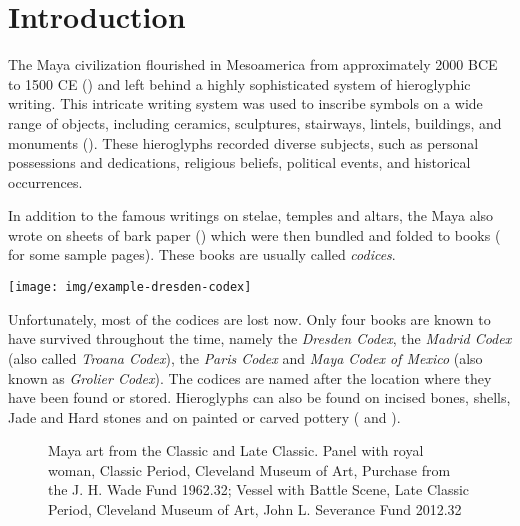 \documentclass[../main.tex]{subfiles}
\begin{document}
\chapter{Introduction}
The Maya civilization flourished in Mesoamerica from approximately 2000 BCE to 1500 CE 
(\cite[3]{estrada-belli2011}) and left behind a highly sophisticated system of hieroglyphic writing. 
This intricate writing system was used to inscribe symbols on a wide range of 
objects, including ceramics, sculptures, stairways, lintels, buildings, 
and monuments (\cite[\ppno~17--27]{thompson1962}). 
These hieroglyphs recorded diverse subjects, such as personal possessions and dedications, 
religious beliefs, political events, and historical occurrences.

In addition to the famous writings on stelae, temples and altars, the Maya also wrote on sheets of 
bark paper (\cite[34\psq]{vonhagen1944}) which were then bundled and 
folded to books ( for some sample pages).
These books are usually called \emph{codices}.
\begin{center}
    \texttt{[image: img/example-dresden-codex]}
    \label{fig:introduction-example-dresden-codex}
\end{center}
Unfortunately, most of the codices are lost now.
Only four books are known to have survived throughout the time, 
namely the \emph{Dresden Codex}, the \emph{Madrid Codex} (also called \emph{Troana Codex}),
the \emph{Paris Codex} and \emph{Maya Codex of Mexico} (also known as \emph{Grolier Codex}).
The codices are named after the location where they have been found or stored.
Hieroglyphs can also be found on incised bones, shells, Jade and Hard stones and on painted or 
carved pottery ( and
).
\begin{figure}
    \centering
    \hfill
    \caption[Maya art from the Classic and Late Classic]{Maya art from the Classic and Late Classic.
              Panel with royal woman, 
             Classic Period, Cleveland Museum of Art, Purchase from the J. H. Wade Fund 1962.32;
              Vessel with Battle Scene, 
             Late Classic Period, Cleveland Museum of Art, John L. Severance Fund 2012.32}
\end{figure}
\end{document}
